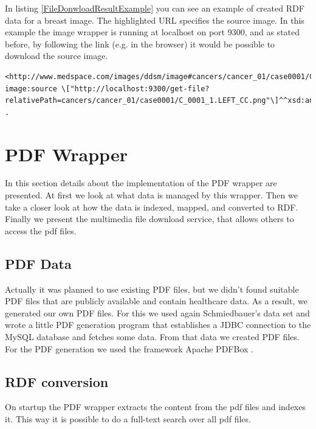 In listing \ref{FileDonwloadResultExample} you can see an example of created RDF data for a breast image. The highlighted URL specifies the source image. In this example the image wrapper is running at localhost on port 9300, and as stated before, by following the link (e.g. in the browser) it would be possible to download the source image.

\begin{lstlisting}[style=RdfCodeStyle, caption=image RDF conversion example, label=FileDonwloadResultExample]
<http://www.medspace.com/images/ddsm/image#cancers/cancer_01/case0001/C_0001_1.LEFT_CC.png>
image:source \["http://localhost:9300/get-file?relativePath=cancers/cancer_01/case0001/C_0001_1.LEFT_CC.png"\]^^xsd:anyURI .
\end{lstlisting}



\section{PDF Wrapper}
In this section details about the implementation of the PDF wrapper are presented.
At first we look at what data is managed by this wrapper. Then we take a closer look at how the data is indexed, mapped, and converted to RDF. Finally we present the multimedia file download service, that allows others to access the pdf files.

\subsection{PDF Data}

Actually it was planned to use existing PDF files, but we didn't found suitable PDF files that are publicly available and contain healthcare data. As a result, we generated our own PDF files. For this we used again Schmiedbauer's data set and wrote a little PDF generation program that establishes a JDBC connection to the MySQL database and fetches some data. From that data we created PDF files. For the PDF generation we used the framework Apache PDFBox \cite{PDFBox}.  

\subsection{RDF conversion}

On startup the PDF wrapper extracts the content from the pdf files and indexes it. This way it is possible to do a full-text search over all pdf files. 

